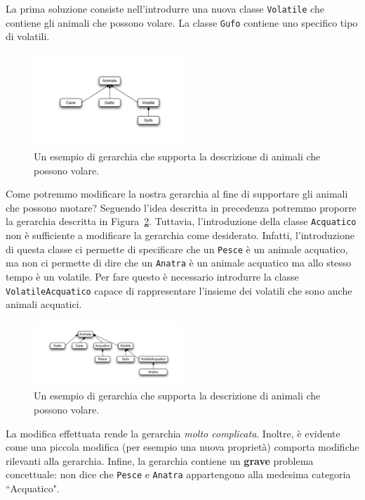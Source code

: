 \documentclass{article}
\begin{document}
La prima soluzione consiste nell'introdurre una nuova classe \texttt{Volatile} che contiene gli animali che possono volare. La classe \texttt{Gufo} contiene uno specifico tipo di volatili. \\

\begin{figure}[h!]
  \centering
    \includegraphics[width=0.5\textwidth]{gerarchia2.pdf}
      \caption{Un esempio di gerarchia che supporta la descrizione di animali che possono volare.}
      \label{Fig:gerarchy3}
\end{figure}

Come potremmo modificare la nostra gerarchia al fine di supportare gli animali che possono nuotare?
Seguendo l'idea descritta in precedenza potremmo proporre la gerarchia descritta in Figura~\ref{Fig:gerarchy4}. Tuttavia, l'introduzione della classe \texttt{Acquatico} non \`e sufficiente a modificare la gerarchia come desiderato. Infatti, l'introduzione di questa classe ci permette di specificare che un \texttt{Pesce} \`e un animale acquatico, ma non ci permette di dire che un \texttt{Anatra} \`e un animale acquatico ma allo stesso tempo \`e un volatile. Per fare questo \`e necessario introdurre la classe \texttt{VolatileAcquatico} capace di rappresentare l'insieme dei volatili che sono anche animali acquatici.
\begin{figure}[h!]
  \centering
    \includegraphics[width=0.5\textwidth]{gerarchia3.pdf}
      \caption{Un esempio di gerarchia che supporta la descrizione di animali che possono volare.}
      \label{Fig:gerarchy4}
\end{figure}
La modifica effettuata rende la gerarchia \emph{molto complicata}. Inoltre, \`e evidente come una piccola modifica (per esempio una nuova  propriet\`a) comporta modifiche rilevanti alla gerarchia. Infine, la gerarchia contiene un \textbf{grave} problema concettuale: non dice che \texttt{Pesce} e \texttt{Anatra} appartengono alla medesima categoria ``Acquatico".
\end{document}
